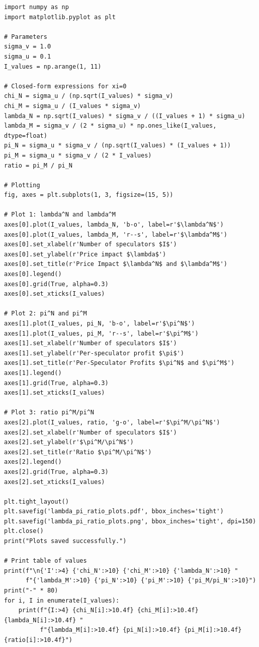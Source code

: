 \begin{lstlisting}[style=pythonstyle]
import numpy as np
import matplotlib.pyplot as plt

# Parameters
sigma_v = 1.0
sigma_u = 0.1
I_values = np.arange(1, 11)

# Closed-form expressions for xi=0
chi_N = sigma_u / (np.sqrt(I_values) * sigma_v)
chi_M = sigma_u / (I_values * sigma_v)
lambda_N = np.sqrt(I_values) * sigma_v / ((I_values + 1) * sigma_u)
lambda_M = sigma_v / (2 * sigma_u) * np.ones_like(I_values, dtype=float)
pi_N = sigma_u * sigma_v / (np.sqrt(I_values) * (I_values + 1))
pi_M = sigma_u * sigma_v / (2 * I_values)
ratio = pi_M / pi_N

# Plotting
fig, axes = plt.subplots(1, 3, figsize=(15, 5))

# Plot 1: lambda^N and lambda^M
axes[0].plot(I_values, lambda_N, 'b-o', label=r'$\lambda^N$')
axes[0].plot(I_values, lambda_M, 'r--s', label=r'$\lambda^M$')
axes[0].set_xlabel(r'Number of speculators $I$')
axes[0].set_ylabel(r'Price impact $\lambda$')
axes[0].set_title(r'Price Impact $\lambda^N$ and $\lambda^M$')
axes[0].legend()
axes[0].grid(True, alpha=0.3)
axes[0].set_xticks(I_values)

# Plot 2: pi^N and pi^M
axes[1].plot(I_values, pi_N, 'b-o', label=r'$\pi^N$')
axes[1].plot(I_values, pi_M, 'r--s', label=r'$\pi^M$')
axes[1].set_xlabel(r'Number of speculators $I$')
axes[1].set_ylabel(r'Per-speculator profit $\pi$')
axes[1].set_title(r'Per-Speculator Profits $\pi^N$ and $\pi^M$')
axes[1].legend()
axes[1].grid(True, alpha=0.3)
axes[1].set_xticks(I_values)

# Plot 3: ratio pi^M/pi^N
axes[2].plot(I_values, ratio, 'g-o', label=r'$\pi^M/\pi^N$')
axes[2].set_xlabel(r'Number of speculators $I$')
axes[2].set_ylabel(r'$\pi^M/\pi^N$')
axes[2].set_title(r'Ratio $\pi^M/\pi^N$')
axes[2].legend()
axes[2].grid(True, alpha=0.3)
axes[2].set_xticks(I_values)

plt.tight_layout()
plt.savefig('lambda_pi_ratio_plots.pdf', bbox_inches='tight')
plt.savefig('lambda_pi_ratio_plots.png', bbox_inches='tight', dpi=150)
plt.close()
print("Plots saved successfully.")

# Print table of values
print(f"\n{'I':>4} {'chi_N':>10} {'chi_M':>10} {'lambda_N':>10} "
      f"{'lambda_M':>10} {'pi_N':>10} {'pi_M':>10} {'pi_M/pi_N':>10}")
print("-" * 80)
for i, I in enumerate(I_values):
    print(f"{I:>4} {chi_N[i]:>10.4f} {chi_M[i]:>10.4f} {lambda_N[i]:>10.4f} "
          f"{lambda_M[i]:>10.4f} {pi_N[i]:>10.4f} {pi_M[i]:>10.4f} {ratio[i]:>10.4f}")
\end{lstlisting}

